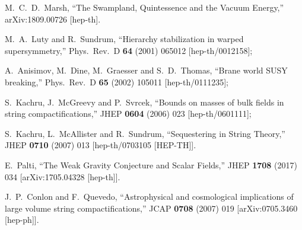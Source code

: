 \documentclass[11pt,a4paper]{article}
\begin{document}
\begin{thebibliography}{99}
  M.~C.~D.~Marsh,
  ``The Swampland, Quintessence and the Vacuum Energy,''
  arXiv:1809.00726 [hep-th].
  
  
  
  M.~A.~Luty and R.~Sundrum,
  ``Hierarchy stabilization in warped supersymmetry,''
  Phys.\ Rev.\ D {\bf 64} (2001) 065012
  [hep-th/0012158];
  
  A.~Anisimov, M.~Dine, M.~Graesser and S.~D.~Thomas,
  ``Brane world SUSY breaking,''
  Phys.\ Rev.\ D {\bf 65} (2002) 105011
  [hep-th/0111235];
  
  S.~Kachru, J.~McGreevy and P.~Svrcek,
  ``Bounds on masses of bulk fields in string compactifications,''
  JHEP {\bf 0604} (2006) 023
  [hep-th/0601111];
  
  S.~Kachru, L.~McAllister and R.~Sundrum,
  ``Sequestering in String Theory,''
  JHEP {\bf 0710} (2007) 013
  [hep-th/0703105 [HEP-TH]].




  
  


  E.~Palti,
  ``The Weak Gravity Conjecture and Scalar Fields,''
  JHEP {\bf 1708} (2017) 034
  [arXiv:1705.04328 [hep-th]].


  J.~P.~Conlon and F.~Quevedo,
  ``Astrophysical and cosmological implications of large volume string compactifications,''
  JCAP {\bf 0708} (2007) 019
  [arXiv:0705.3460 [hep-ph]].



\end{thebibliography}
\end{document}
